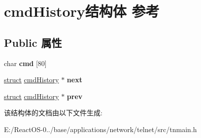 \hypertarget{structcmd_history}{}\section{cmd\+History结构体 参考}
\label{structcmd_history}
\subsection*{Public 属性}
\begin{DoxyCompactItemize}
\item 
\mbox{\label{structcmd_history_a4c36b84d6287868cd4fce00ad886ff83}} 
char {\bfseries cmd} \mbox{[}80\mbox{]}
\item 
\mbox{\label{structcmd_history_a5323807c0bf039149c503c90e28d3aea}} 
\hyperlink{interfacestruct}{struct} \hyperlink{structcmd_history}{cmd\+History} $\ast$ {\bfseries next}
\item 
\mbox{\label{structcmd_history_a8adbc9c1069aa89c6fca49e7b7445a0c}} 
\hyperlink{interfacestruct}{struct} \hyperlink{structcmd_history}{cmd\+History} $\ast$ {\bfseries prev}
\end{DoxyCompactItemize}


该结构体的文档由以下文件生成\+:\begin{DoxyCompactItemize}
\item 
E\+:/\+React\+O\+S-\/0../base/applications/network/telnet/src/tnmain.\+h\end{DoxyCompactItemize}

